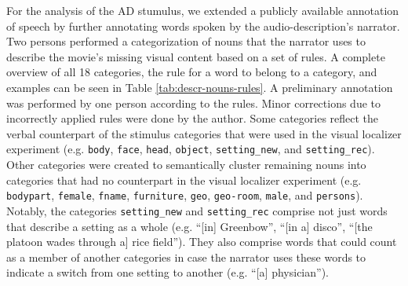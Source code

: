 \documentclass[english]{article}
\begin{document}
For the analysis of the AD stumulus, we extended a publicly available annotation
of speech \citep{haeusler2020speechanno} by further annotating words spoken by
the audio-description's narrator.
Two persons performed a categorization of nouns that the narrator uses to
describe the movie's missing visual content based on a set of rules.
A complete overview of all 18 categories, the rule for a word to belong to a
category, and examples can be seen in Table \ref{tab:descr-nouns-rules}.
A preliminary annotation was performed by one person according to the rules.
Minor corrections due to incorrectly applied rules were done by the author.
Some categories reflect the verbal counterpart of the stimulus categories that
were used in the visual localizer experiment (e.g. \texttt{body}, \texttt{face},
\texttt{head}, \texttt{object}, \texttt{setting\_new}, and
\texttt{setting\_rec}).
Other categories were created to semantically cluster remaining nouns into
categories that had no counterpart in the visual localizer experiment (e.g.
\texttt{bodypart}, \texttt{female}, \texttt{fname}, \texttt{furniture},
\texttt{geo}, \texttt{geo-room}, \texttt{male}, and \texttt{persons}).
Notably, the categories \texttt{setting\_new} and \texttt{setting\_rec} comprise
not just words that describe a setting as a whole (e.g. ``[in] Greenbow'', ``[in
a] disco'', ``[the platoon wades through a] rice field''). They also comprise
words that could count as a member of another categories in case the narrator
uses these words to indicate a switch from one setting to another (e.g. ``[a]
physician'').
\end{document}
